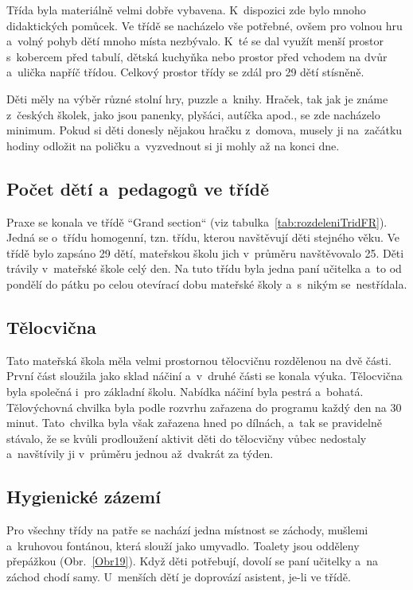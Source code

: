 			Třída byla materiálně velmi dobře vybavena. K~dispozici zde bylo mnoho didaktických pomůcek. Ve třídě se nacházelo vše potřebné, ovšem pro volnou hru a~volný pohyb dětí mnoho místa nezbývalo. K~té se dal využít menší prostor s kobercem před tabulí, dětská kuchyňka nebo prostor před vchodem na dvůr a~ulička napříč třídou. Celkový prostor třídy se zdál pro 29 dětí stísněně.

			Děti měly na výběr různé stolní hry, puzzle a~knihy. Hraček, tak jak je známe z~českých školek, jako jsou panenky, plyšáci, autíčka apod., se zde nacházelo minimum. Pokud si děti donesly nějakou hračku z~domova, musely ji na začátku hodiny odložit na poličku a~vyzvednout si ji mohly až na konci dne. 

		\subsection{Počet dětí a~pedagogů ve třídě}
		\label{trida}

			Praxe se konala ve třídě “Grand section“ (viz tabulka~\ref{tab:rozdeleniTridFR}). Jedná se o~třídu homogenní, tzn. třídu, kterou navštěvují děti stejného věku. Ve třídě bylo zapsáno 29 dětí, mateřskou školu jich v průměru navštěvovalo 25. Děti trávily v mateřské škole celý den. Na tuto třídu byla jedna paní učitelka a~to od pondělí do pátku po celou otevírací dobu mateřské školy a~s nikým se nestřídala. 

		\subsection{Tělocvična}
			Tato mateřská škola měla velmi prostornou tělocvičnu rozdělenou na dvě části. První část sloužila jako sklad náčiní a~v~druhé části se konala výuka. Tělocvična byla společná i~pro základní školu. Nabídka náčiní byla pestrá a~bohatá. Tělovýchovná chvilka byla podle rozvrhu zařazena do programu každý den na 30 minut. Tato chvilka byla však zařazena hned po dílnách, a~tak se pravidelně stávalo, že se kvůli prodloužení aktivit děti do tělocvičny vůbec nedostaly a~navštívily ji v~průměru jednou až dvakrát za týden. 

		\subsection{Hygienické zázemí}
		\label{zachody}
			Pro všechny třídy na patře se nachází jedna místnost se záchody, mušlemi a~kruhovou fontánou, která slouží jako umyvadlo. Toalety jsou odděleny přepážkou (Obr.~\ref{Obr19}). Když děti potřebují, dovolí se paní učitelky a~na záchod chodí samy. U~menších dětí je doprovází asistent, je-li ve třídě. 
	

